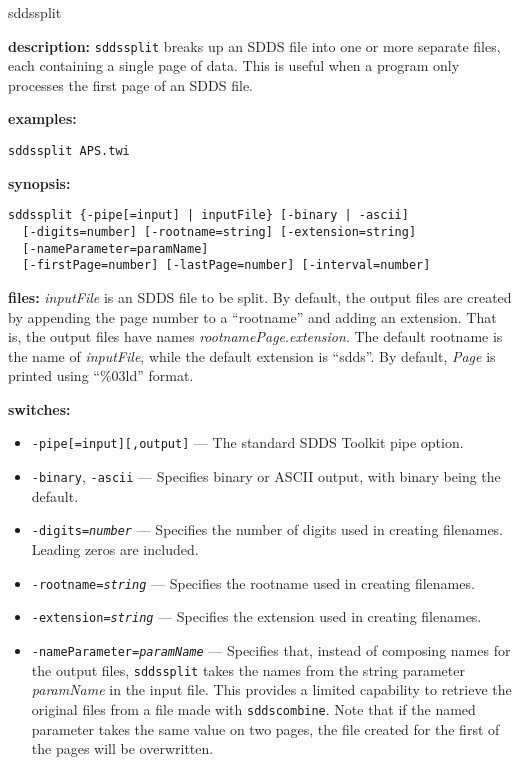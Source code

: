 \begin{sddsprog}{sddssplit}
  \item \textbf{description:} \verb|sddssplit| breaks up an SDDS file into one or more separate files, each containing a single page of data. This is useful when a program only processes the first page of an SDDS file.
  \item \textbf{examples:}
  \begin{verbatim}
sddssplit APS.twi
  \end{verbatim}
  \item \textbf{synopsis:}
  \begin{verbatim}
sddssplit {-pipe[=input] | inputFile} [-binary | -ascii]
  [-digits=number] [-rootname=string] [-extension=string]
  [-nameParameter=paramName]
  [-firstPage=number] [-lastPage=number] [-interval=number]
  \end{verbatim}
  \item \textbf{files:} \emph{inputFile} is an SDDS file to be split. By default, the output files are created by appending the page number to a ``rootname'' and adding an extension. That is, the output files have names \emph{rootname}\emph{Page}.\emph{extension}.
  The default rootname is the name of \emph{inputFile}, while the default extension is ``sdds''. By default, \emph{Page} is printed using ``\%03ld'' format.
  \item \textbf{switches:}
    \begin{itemize}
      \item {\tt -pipe[=input][,output]} --- The standard SDDS Toolkit pipe option.
      \item {\tt -binary}, {\tt -ascii} --- Specifies binary or ASCII output, with binary being the default.
      \item {\tt -digits=\emph{number}} --- Specifies the number of digits used in creating filenames. Leading zeros are included.
      \item {\tt -rootname=\emph{string}} --- Specifies the rootname used in creating filenames.
      \item {\tt -extension=\emph{string}} --- Specifies the extension used in creating filenames.
      \item {\tt -nameParameter=\emph{paramName}} --- Specifies that, instead of composing names for the output files, \verb|sddssplit| takes the names from the string parameter \emph{paramName} in the input file. This provides a limited capability to retrieve the original files from a file made with \verb|sddscombine|. Note that if the named parameter takes the same value on two pages, the file created for the first of the pages will be overwritten.

\end{itemize}
\end{sddsprog}
